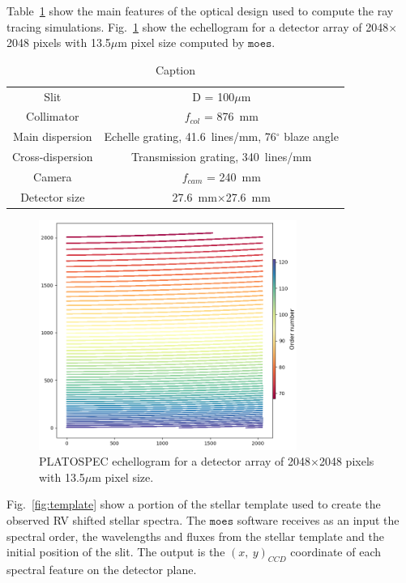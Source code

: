 \documentclass{article}
\begin{document}
Table~\ref{tab:optical_data} show the main features of the optical design used to compute the ray tracing simulations. Fig.~\ref{fig:echellogram} show the echellogram for a detector array of 2048$\times$2048 pixels with 13.5$\mu$m pixel size computed by $\texttt{moes}$.

\begin{table}[h!]
    \centering
    \begin{tabular}{|c|c|}
    \hline
    Slit & D = 100$\mu$m \\
    Collimator & $f_{col}$ = 876~mm \\
    Main dispersion & Echelle grating, 41.6~lines/mm, 76$^\circ$ blaze angle\\
    Cross-dispersion & Transmission grating, 340~lines/mm\\
    Camera & $f_{cam}$ = 240~mm \\
    Detector size & 27.6~mm$\times$27.6~mm \\
    \hline
    \end{tabular}
    \caption{Caption}
    \label{tab:optical_data}
\end{table}

\begin{figure}[h!]
    \centering
    \includegraphics[width=0.75\textwidth]{echellogram_platospec.png}
    \caption{PLATOSPEC echellogram for a detector array of 2048$\times$2048 pixels with 13.5$\mu$m pixel size.}
    \label{fig:echellogram}
\end{figure}
Fig.~\ref{fig:template} show a portion of the stellar template used to create the observed RV shifted stellar spectra. The $\texttt{moes}$ software receives as an input the spectral order, the wavelengths and fluxes from the stellar template and the initial position of the slit. The output is the $(x,~y)_{CCD}$ coordinate of each spectral feature on the detector plane.
\end{document}
